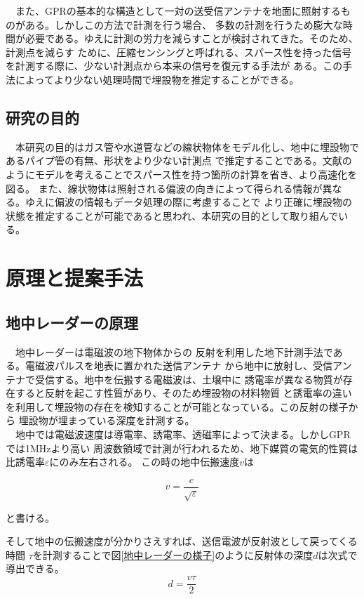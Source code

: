 \documentclass[a4paper,12pt]{jsreport}
\begin{document}
　また、GPRの基本的な構造として一対の送受信アンテナを地面に照射するものがある。しかしこの方法で計測を行う場合、
多数の計測を行うため膨大な時間が必要である。ゆえに計測の労力を減らすことが検討されてきた。そのため、計測点を減らす
ために、圧縮センシングと呼ばれる、スパース性を持った信号を計測する際に、少ない計測点から本来の信号を復元する手法が
ある。この手法によってより少ない処理時間で埋設物を推定することができる。

\section{研究の目的}
　本研究の目的はガス管や水道管などの線状物体をモデル化し、地中に埋設物であるパイプ管の有無、形状をより少ない計測点
で推定することである。文献\cite{imai}のようにモデルを考えることでスパース性を持つ箇所の計算を省き、より高速化を図る。
また、線状物体は照射される偏波の向きによって得られる情報が異なる。ゆえに偏波の情報もデータ処理の際に考慮することで
より正確に埋設物の状態を推定することが可能であると思われ、本研究の目的として取り組んでいる。





\chapter{原理と提案手法}



\section{地中レーダーの原理}
　地中レーダーは電磁波の地下物体からの
反射を利用した地下計測手法である。電磁波パルスを地表に置かれた送信アンテナ
から地中に放射し、受信アンテナで受信する。地中を伝搬する電磁波は、土壌中に
誘電率が異なる物質が存在すると反射を起こす性質があり、そのため埋設物の材料物質
と誘電率の違いを利用して埋設物の存在を検知することが可能となっている。この反射の様子から
埋設物が埋まっている深度を計測する。
\\　地中では電磁波速度は導電率、誘電率、透磁率によって決まる。しかしGPRでは1MHzより高い
周波数領域で計測が行われるため、地下媒質の電気的性質は比誘電率$\varepsilon$にのみ左右される。
この時の地中伝搬速度$v$は

\begin{equation}
  v =
  \frac{c}{\sqrt{\varepsilon}} 
  \end{equation}

と書ける。


そして地中の伝搬速度が分かりさえすれば、送信電波が反射波として戻ってくる時間
$\tau$を計測することで図\ref{地中レーダーの様子}のように反射体の深度$d$は次式で導出できる。
\begin{equation}
  d=
  \frac{v \tau}{2} 
  \end{equation}
  
\end{document}
